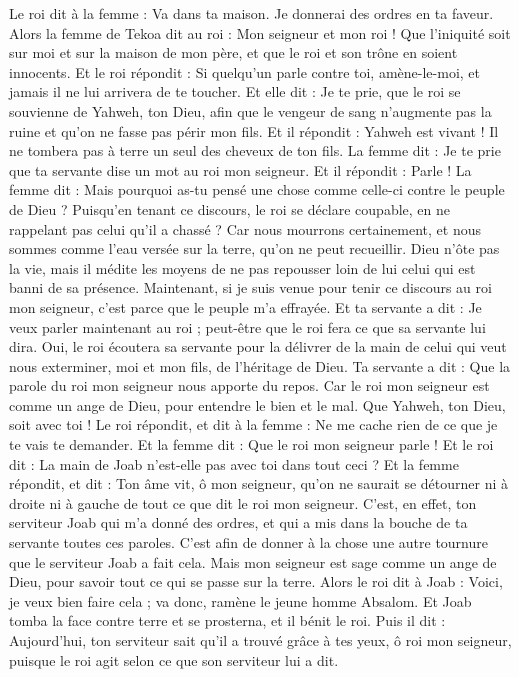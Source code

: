 \begin{multicols}{2}
Le roi dit à la femme : Va dans ta maison. Je donnerai des ordres en ta faveur.
Alors la femme de Tekoa dit au roi : Mon seigneur et mon roi ! Que l'iniquité soit sur moi et sur la maison de mon père, et que le roi et son trône en soient innocents.
Et le roi répondit : Si quelqu’un parle contre toi, amène-le-moi, et jamais il ne lui arrivera de te toucher.
Et elle dit : Je te prie, que le roi se souvienne de Yahweh, ton Dieu, afin que le vengeur de sang n’augmente pas la ruine et qu'on ne fasse pas périr mon fils. Et il répondit : Yahweh est vivant ! Il ne tombera pas à terre un seul des cheveux de ton fils.
La femme dit : Je te prie que ta servante dise un mot au roi mon seigneur. Et il répondit : Parle !
La femme dit : Mais pourquoi as-tu pensé une chose comme celle-ci contre le peuple de Dieu ? Puisqu’en tenant ce discours, le roi se déclare coupable, en ne rappelant pas celui qu’il a chassé ?
Car nous mourrons certainement, et nous sommes comme l’eau versée sur la terre, qu’on ne peut recueillir. Dieu n’ôte pas la vie, mais il médite les moyens de ne pas repousser loin de lui celui qui est banni de sa présence.
Maintenant, si je suis venue pour tenir ce discours au roi mon seigneur, c’est parce que le peuple m'a effrayée. Et ta servante a dit : Je veux parler maintenant au roi ; peut-être que le roi fera ce que sa servante lui dira.
Oui, le roi écoutera sa servante pour la délivrer de la main de celui qui veut nous exterminer, moi et mon fils, de l'héritage de Dieu.
Ta servante a dit : Que la parole du roi mon seigneur nous apporte du repos. Car le roi mon seigneur est comme un ange de Dieu, pour entendre le bien et le mal. Que Yahweh, ton Dieu, soit avec toi !
Le roi répondit, et dit à la femme : Ne me cache rien de ce que je te vais te demander. Et la femme dit : Que le roi mon seigneur parle !
Et le roi dit : La main de Joab n’est-elle pas avec toi dans tout ceci ? Et la femme répondit, et dit : Ton âme vit, ô mon seigneur, qu'on ne saurait se détourner ni à droite ni à gauche de tout ce que dit le roi mon seigneur. C’est, en effet, ton serviteur Joab qui m’a donné des ordres, et qui a mis dans la bouche de ta servante toutes ces paroles.
C'est afin de donner à la chose une autre tournure que le serviteur Joab a fait cela. Mais mon seigneur est sage comme un ange de Dieu, pour savoir tout ce qui se passe sur la terre.
Alors le roi dit à Joab : Voici, je veux bien faire cela ; va donc, ramène le jeune homme Absalom.
Et Joab tomba la face contre terre et se prosterna, et il bénit le roi. Puis il dit : Aujourd'hui, ton serviteur sait qu'il a trouvé grâce à tes yeux, ô roi mon seigneur, puisque le roi agit selon ce que son serviteur lui a dit.

\end{multicols}
